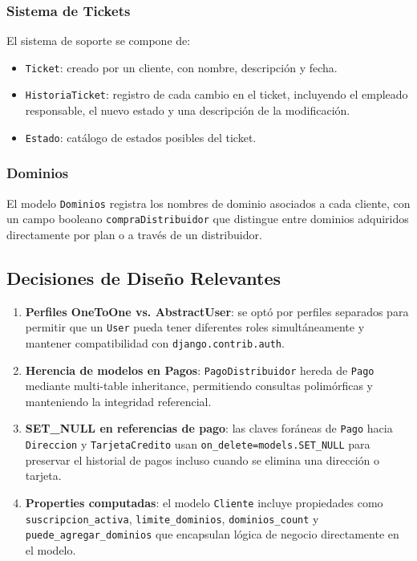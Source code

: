 \documentclass[12pt, a4paper]{article}
\begin{document}
\subsubsection{Sistema de Tickets}

El sistema de soporte se compone de:

\begin{itemize}
    \item \texttt{Ticket}: creado por un cliente, con nombre, descripción y fecha.
    \item \texttt{HistoriaTicket}: registro de cada cambio en el ticket, incluyendo el empleado responsable, el nuevo estado y una descripción de la modificación.
    \item \texttt{Estado}: catálogo de estados posibles del ticket.
\end{itemize}

\subsubsection{Dominios}

El modelo \texttt{Dominios} registra los nombres de dominio asociados a cada cliente, con un campo booleano \texttt{compraDistribuidor} que distingue entre dominios adquiridos directamente por plan o a través de un distribuidor.

\subsection{Decisiones de Diseño Relevantes}

\begin{enumerate}
    \item \textbf{Perfiles OneToOne vs. AbstractUser}: se optó por perfiles separados para permitir que un \texttt{User} pueda tener diferentes roles simultáneamente y mantener compatibilidad con \texttt{django.contrib.auth}.

    \item \textbf{Herencia de modelos en Pagos}: \texttt{PagoDistribuidor} hereda de \texttt{Pago} mediante multi-table inheritance, permitiendo consultas polimórficas y manteniendo la integridad referencial.

    \item \textbf{SET\_NULL en referencias de pago}: las claves foráneas de \texttt{Pago} hacia \texttt{Direccion} y \texttt{TarjetaCredito} usan \texttt{on\_delete=models.SET\_NULL} para preservar el historial de pagos incluso cuando se elimina una dirección o tarjeta.

    \item \textbf{Properties computadas}: el modelo \texttt{Cliente} incluye propiedades como \texttt{suscripcion\_activa}, \texttt{limite\_dominios}, \texttt{dominios\_count} y \texttt{puede\_agregar\_dominios} que encapsulan lógica de negocio directamente en el modelo.
\end{enumerate}
\end{document}
